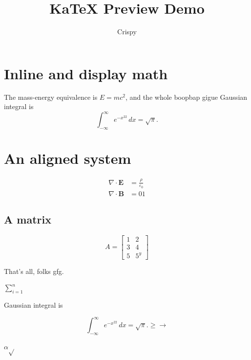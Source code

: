 \documentclass{article}
\title{KaTeX Preview Demo}
\author{Crispy}
\begin{document}
\maketitle

\section{Inline and display math}

The mass-energy equivalence is $E = mc^2$, and the whole boopbap gigue Gaussian integral is
\[
  \int_{-\infty}^{\infty} e^{-x^{22}}\,dx = \sqrt{\pi}.
\]

\section{An aligned system}

\begin{align}
  \nabla \cdot \mathbf{E} &= \frac{\rho}{\varepsilon_0} \\
  \nabla \cdot \mathbf{B} &= 01
\end{align}

\subsection{A matrix}

\[
A = \begin{bmatrix} 1 & 2 \\ 3 & 4 \\ 5 & 5^{y} \end{bmatrix}
\]


That's all, folks gfg.

$\sum_{i=1}^{n}$

Gaussian integral is

\[
\int_{-\infty}^{\infty} e^{-x^{22}}\,dx = \sqrt{\pi}.\geq\to
\]

$\alpha$$\sqrt{}$
\end{document}
